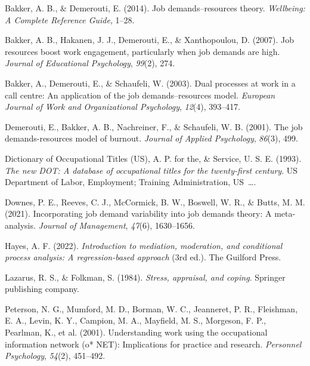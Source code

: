 \documentclass[
  man]{apa6}
\newlength{\cslhangindent}
\newlength{\cslentryspacingunit} %
\newenvironment{CSLReferences}[2] %
 {%
  \setlength{\parindent}{0pt}
  \ifodd #1
  \let\oldpar\par
  \def\par{\hangindent=\cslhangindent\oldpar}
  \fi
  \setlength{\parskip}{#2\cslentryspacingunit}
 }%
 {}
\begin{document}
\hypertarget{refs}{}
\begin{CSLReferences}{1}{0}
\leavevmode{}%
Bakker, A. B., \& Demerouti, E. (2014). Job demands--resources theory. \emph{Wellbeing: A Complete Reference Guide}, 1--28.

\leavevmode{}%
Bakker, A. B., Hakanen, J. J., Demerouti, E., \& Xanthopoulou, D. (2007). Job resources boost work engagement, particularly when job demands are high. \emph{Journal of Educational Psychology}, \emph{99}(2), 274.

\leavevmode{}%
Bakker, A., Demerouti, E., \& Schaufeli, W. (2003). Dual processes at work in a call centre: An application of the job demands--resources model. \emph{European Journal of Work and Organizational Psychology}, \emph{12}(4), 393--417.

\leavevmode{}%
Demerouti, E., Bakker, A. B., Nachreiner, F., \& Schaufeli, W. B. (2001). The job demands-resources model of burnout. \emph{Journal of Applied Psychology}, \emph{86}(3), 499.

\leavevmode{}%
Dictionary of Occupational Titles (US), A. P. for the, \& Service, U. S. E. (1993). \emph{The new DOT: A database of occupational titles for the twenty-first century}. US Department of Labor, Employment; Training Administration, US~\ldots.

\leavevmode{}%
Downes, P. E., Reeves, C. J., McCormick, B. W., Boswell, W. R., \& Butts, M. M. (2021). Incorporating job demand variability into job demands theory: A meta-analysis. \emph{Journal of Management}, \emph{47}(6), 1630--1656.

\leavevmode{}%
Hayes, A. F. (2022). \emph{Introduction to mediation, moderation, and conditional process analysis: A regression-based approach} (3rd ed.). The Guilford Press.

\leavevmode{}%
Lazarus, R. S., \& Folkman, S. (1984). \emph{Stress, appraisal, and coping}. Springer publishing company.

\leavevmode{}%
Peterson, N. G., Mumford, M. D., Borman, W. C., Jeanneret, P. R., Fleishman, E. A., Levin, K. Y., Campion, M. A., Mayfield, M. S., Morgeson, F. P., Pearlman, K., et al. (2001). Understanding work using the occupational information network (o* NET): Implications for practice and research. \emph{Personnel Psychology}, \emph{54}(2), 451--492.


\end{CSLReferences}
\end{document}
